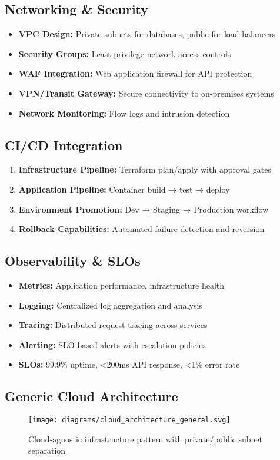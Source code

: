 \subsection{Networking \& Security}
\begin{itemize}
  \item \textbf{VPC Design:} Private subnets for databases, public for load balancers
  \item \textbf{Security Groups:} Least-privilege network access controls
  \item \textbf{WAF Integration:} Web application firewall for API protection
  \item \textbf{VPN/Transit Gateway:} Secure connectivity to on-premises systems
  \item \textbf{Network Monitoring:} Flow logs and intrusion detection
\end{itemize}

\subsection{CI/CD Integration}
\begin{enumerate}
  \item \textbf{Infrastructure Pipeline:} Terraform plan/apply with approval gates
  \item \textbf{Application Pipeline:} Container build → test → deploy
  \item \textbf{Environment Promotion:} Dev → Staging → Production workflow
  \item \textbf{Rollback Capabilities:} Automated failure detection and reversion
\end{enumerate}

\subsection{Observability \& SLOs}
\begin{itemize}
  \item \textbf{Metrics:} Application performance, infrastructure health
  \item \textbf{Logging:} Centralized log aggregation and analysis
  \item \textbf{Tracing:} Distributed request tracing across services
  \item \textbf{Alerting:} SLO-based alerts with escalation policies
  \item \textbf{SLOs:} 99.9\% uptime, <200ms API response, <1\% error rate
\end{itemize}

\subsection{Generic Cloud Architecture}
\begin{figure}[h]
  \centering
  \texttt{[image: diagrams/cloud\_architecture\_general.svg]}
  \caption{Cloud-agnostic infrastructure pattern with private/public subnet separation}
\end{figure}

